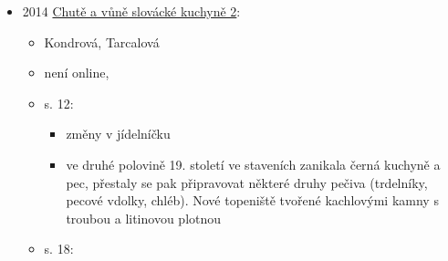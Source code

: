 \begin{itemize}
  \begin{itemize}
  \tightlist
  \item
    zajímavej je tam rozhovor s ředitelem gastronomickýho muzea,
  \item
    redaktor se ptá: Oh, look! An `Old Bohemian' something or other, and
    maybe that is a traditional thing that Czechs are eating.'' The
    history suggests otherwise. It is perhaps Hungarian, or Slovak, or
    Turkic?
  \item
    ředitel: No, it goes way beck to Neolithic times. Trdelník ties very
    directly to the open fire. Prior to bread ovens, and prior to
    kitchen stoves or hot plates, there was no other way to cook dough
    other than to twist it on a stick of wood and rotate it over an open
    fire. In a practical sense, this made it accessible for people who
    were travelling, or people staying with their herds out in the
    countryside. So that is the charm of it. As far as it is known in
    Europe, it starts with ancient Greece and practically every nation
    from Sweden down to the south, east and west, people knew Trdelník.
    The only difference is that it had so many local names. The word
    `Trdelník' is the only thing about this food, which is purely Czech.
    It is a very ancient word, and it essentially denotes the use of a
    wooden stick, mallet or spindle -- when twisting yarn this word was
    used. So this is very nice word, which has many meanings in the
    Czech language. For example `trdlo' is a gentle word for someone who
    is a little bit confused in a given situation.
  \item
    pak je tam rozhovor s prodejcem, co si myslí, že možná pochází z
    Maďarska
  \end{itemize}
\item
  2014
  \href{https://ceskadigitalniknihovna.cz/uuid/uuid:a8cb0db0-fbeb-11ee-a794-5ef3fc9bb22f}{Chutě
  a vůně slovácké kuchyně 2}:

  \begin{itemize}
  \tightlist
  \item
    Kondrová, Tarcalová
  \item
    není online,
  \item
    s. 12:

    \begin{itemize}
    \tightlist
    \item
      změny v jídelníčku
    \item
      ve druhé polovině 19. století ve staveních zanikala černá kuchyně
      a pec, přestaly se pak připravovat některé druhy pečiva
      (trdelníky, pecové vdolky, chléb). Nové topeniště tvořené
      kachlovými kamny s troubou a litinovou plotnou
    \end{itemize}
  \item
    s. 18:


\end{itemize}
\end{itemize}
